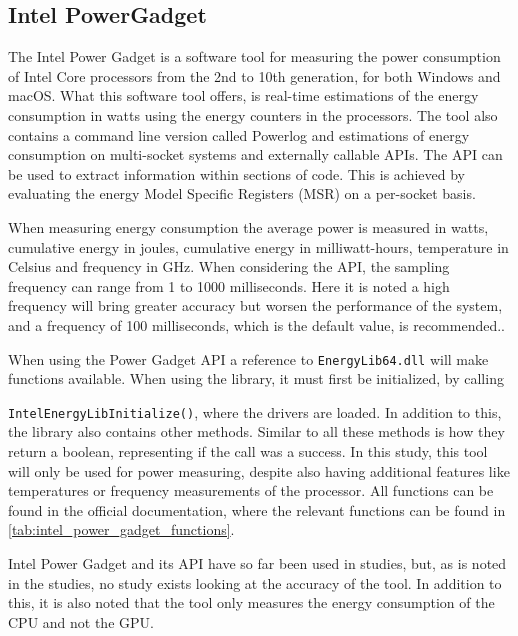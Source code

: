 \subsection{Intel PowerGadget}

The Intel Power Gadget\cite[]{powergadget} is a software tool for measuring the power consumption of Intel Core processors from the 2nd to 10th generation, for both Windows and macOS. What this software tool offers, is real-time  estimations of the energy consumption in watts using the energy counters in the processors. 
The tool also contains a command line version called Powerlog and estimations of energy consumption on multi-socket systems and externally callable APIs. The API can be used to extract information within sections of code. This is achieved by evaluating the energy Model Specific Registers (MSR) on a per-socket basis.

When measuring energy consumption the average power is measured in watts, cumulative energy in joules, cumulative energy in milliwatt-hours, temperature in Celsius and frequency in GHz. When considering the API, the sampling frequency can range from 1 to 1000 milliseconds. Here it is noted a high frequency will bring greater accuracy but worsen the performance of the system, and a frequency of 100 milliseconds, which is the default value, is recommended.\cite[]{powergadget_api}.

When using the Power Gadget API a reference to \texttt{EnergyLib64.dll} will make functions available. When using the library, it must first be initialized, by calling 

\texttt{IntelEnergyLibInitialize()}, where the drivers are loaded. In addition to this, the library also contains other methods. Similar to all these methods is how they return a boolean, representing if the call was a success. In this study, this tool will only be used for power measuring, despite also having additional features like temperatures or frequency measurements of the processor. All functions can be found in the official documentation\cite[]{powergadget_api}, where the relevant functions can be found in \cref{tab:intel_power_gadget_functions}.

Intel Power Gadget and its API have so far been used in studies\cite[]{Bruce2015ReducingEC, Ozturk2019, Unlu2021}, but, as is noted in the studies, no study exists looking at the accuracy of the tool. In addition to this, it is also noted that the tool only measures the energy consumption of the CPU and not the GPU.


